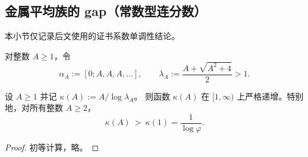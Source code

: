 \subsection{金属平均族的 gap（常数型连分数）}\label{app:kronecker-discrepancy-metallic-gap}

本小节仅记录后文使用的证书系数单调性结论。

\begin{definition}[常数型与金属平均族]\label{def:const-type}
对整数 $A\ge 1$，令
\[
\alpha_A:=[0;A,A,A,\dots],
\qquad
\lambda_A:=\frac{A+\sqrt{A^2+4}}{2}>1.
\]
\end{definition}

\begin{theorem}\label{thm:metallic-gap}
设 $A\ge 1$ 并记 \(\kappa(A):=A/\log\lambda_A\)。
则函数 $\kappa(A)$ 在 $[1,\infty)$ 上严格递增。特别地，对所有整数 $A\ge 2$，
\[
\kappa(A)\ >\ \kappa(1)=\frac{1}{\log\varphi}.
\]
\end{theorem}

\begin{proof}
初等计算，略。
\end{proof}
